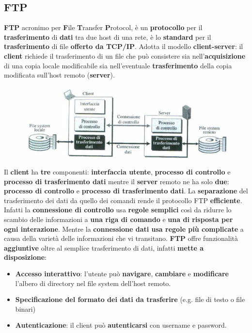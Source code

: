 \documentclass[11pt,a4paper,oneside]{book}
\theoremstyle{definition}
\begin{document}
\subsection{FTP}
\label{sec:FTP}
\textbf{FTP} acronimo per \textbf{F}ile \textbf{T}ransfer \textbf{P}rotocol, è un \textbf{protocollo} per il \textbf{trasferimento} di \textbf{dati} tra due host di una rete, è lo \textbf{standard} per il \textbf{trasferimento} di file \textbf{offerto da TCP/IP}. Adotta il modello \textbf{client-server}: il \textbf{client} richiede il trasferimento di un file che può consistere sia nell'\textbf{acquisizione} di una copia locale modificabile sia nell'eventuale \textbf{trasferimento} della copia modificata sull'host remoto (\textbf{server}).
\begin{figure}[!h]
	\includegraphics[scale=0.4]{Immagini/FTP.png}
	\centering
\end{figure}\newline
Il \textbf{client} ha \textbf{tre} componenti: \textbf{interfaccia utente}, \textbf{processo di controllo} e \textbf{processo di trasferimento dati} mentre il \textbf{server} remoto ne ha solo \textbf{due}: \textbf{processo di controllo} e \textbf{processo di trasferimento dati}. La \textbf{separazione} del trasferimento dei dati da quello dei comandi rende il protocollo FTP \textbf{efficiente}. Infatti la \textbf{connessione di controllo} usa \textbf{regole semplici} così da ridurre lo scambio delle informazioni a \textbf{una riga di comando} e \textbf{una di risposta per ogni interazione}. Mentre la \textbf{connessione dati usa regole più complicate} a causa della varietà delle informazioni che vi transitano.
\textbf{FTP} offre funzionalità \textbf{aggiuntive} oltre al semplice trasferimento di dati, infatti \textbf{mette a disposizione}:
\begin{itemize}
	\item \textbf{Accesso interattivo}: l’utente può \textbf{navigare}, \textbf{cambiare} e \textbf{modificare} l’albero di directory nel file system dell'host remoto.
	\item \textbf{Specificazione del formato dei dati da trasferire} (e.g. file di testo o file binari)
	\item \textbf{Autenticazione}: il client può \textbf{autenticarsi} con username e password.
\end{itemize}
\end{document}
